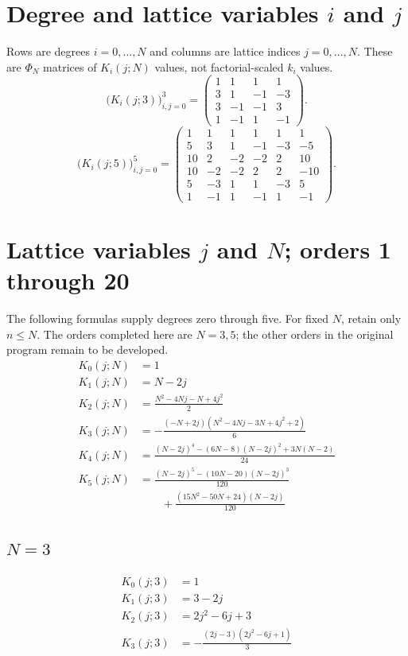 \section{Degree and lattice variables $i$ and $j$}
Rows are degrees $i=0,\ldots,N$ and columns are lattice indices
$j=0,\ldots,N$. These are $\Phi_N$ matrices of $K_i(j;N)$ values,
not factorial-scaled $k_i$ values.
\begingroup
\small
\setlength{\arraycolsep}{3pt}
\[
\bigl(K_i(j;3)\bigr)_{i,j=0}^{3}=\begin{pmatrix}
1 & 1 & 1 & 1 \\
3 & 1 & -1 & -3 \\
3 & -1 & -1 & 3 \\
1 & -1 & 1 & -1
\end{pmatrix}.
\]
\endgroup
\begingroup
\small
\setlength{\arraycolsep}{3pt}
\[
\bigl(K_i(j;5)\bigr)_{i,j=0}^{5}=\begin{pmatrix}
1 & 1 & 1 & 1 & 1 & 1 \\
5 & 3 & 1 & -1 & -3 & -5 \\
10 & 2 & -2 & -2 & 2 & 10 \\
10 & -2 & -2 & 2 & 2 & -10 \\
5 & -3 & 1 & 1 & -3 & 5 \\
1 & -1 & 1 & -1 & 1 & -1
\end{pmatrix}.
\]
\endgroup
\section{Lattice variables $j$ and $N$; orders 1 through 20}
The following formulas supply degrees zero through five. For fixed $N$,
retain only $n\leq N$. The orders completed here are $N=3,5$;
the other orders in the original program remain to be developed.
\begin{align*}
K_{0}(j;N)&=1 \\
K_{1}(j;N)&=N - 2 j \\
K_{2}(j;N)&=\frac{N^{2} - 4 N j - N + 4 j^{2}}{2} \\
K_{3}(j;N)&=- \frac{\left(- N + 2 j\right) \left(N^{2} - 4 N j - 3 N + 4 j^{2} + 2\right)}{6} \\
K_{4}(j;N)&=\frac{(N-2j)^4-(6N-8)(N-2j)^2+3N(N-2)}{24} \\
K_{5}(j;N)&=\frac{(N-2j)^5-(10N-20)(N-2j)^3}{120} \\ &\qquad+\frac{(15N^2-50N+24)(N-2j)}{120}
\end{align*}
\subsection{$N=3$}
\begin{align*}
K_{0}(j;3)&=1 \\
K_{1}(j;3)&=3 - 2 j \\
K_{2}(j;3)&=2 j^{2} - 6 j + 3 \\
K_{3}(j;3)&=- \frac{\left(2 j - 3\right) \left(2 j^{2} - 6 j + 1\right)}{3}
\end{align*}
